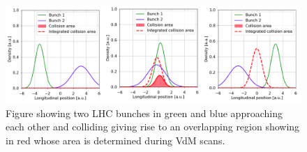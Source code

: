 \begin{figure}[H]
  \centering
  \includegraphics[width=\columnwidth]{./vdm_image.png}
  \caption{\onehalfspacing Figure showing two LHC bunches in green and blue approaching each other and colliding giving rise to an overlapping region showing in red whose area is determined during VdM scans.}
  \label{fig:CMS}
\end{figure}






